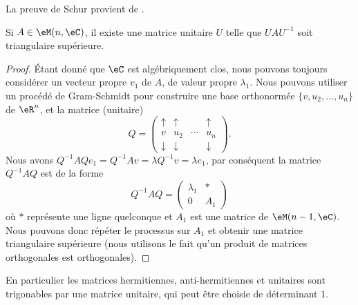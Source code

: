 La preuve de Schur provient de \cite{NormHKNPKRqV}.

\begin{lemma}  \label{LemSchurComplHAftTq}
    Si \( A\in\eM(n,\eC)\), il existe une matrice unitaire \( U\) telle que \( UAU^{-1}\) soit triangulaire supérieure.
\end{lemma}

\begin{proof}
    Étant donné que \( \eC\) est algébriquement clos, nous pouvons toujours considérer un vecteur propre \( v_1\) de \( A\), de valeur propre \( \lambda_1\). Nous pouvons utiliser un procédé de Gram-Schmidt pour construire une base orthonormée \( \{ v,u_2,\ldots, u_n \}\) de \( \eR^n\), et la matrice (unitaire)
    \begin{equation}
        Q=\begin{pmatrix}
             \uparrow   &   \uparrow    &       &   \uparrow    \\
             v   &   u_2    &   \cdots    &   u_n    \\ 
             \downarrow   &   \downarrow    &       &   \downarrow
         \end{pmatrix}.
    \end{equation}
    Nous avons \( Q^{-1}AQe_1=Q^{-1} Av=\lambda Q^{-1} v=\lambda e_1\), par conséquent la matrice \( Q^{-1} AQ\) est de la forme
    \begin{equation}
        Q^{-1}AQ=\begin{pmatrix}
            \lambda_1    &   *    \\ 
            0    &   A_1    
        \end{pmatrix}
    \end{equation}
    où \( *\) représente une ligne quelconque et \( A_1\) est une matrice de \( \eM(n-1,\eC)\). Nous pouvons donc répéter le processus sur \( A_1\) et obtenir une matrice triangulaire supérieure (nous utilisons le fait qu'un produit de matrices orthogonales est orthogonales).  
\end{proof}
En particulier les matrices hermitiennes, anti-hermitiennes et unitaires sont trigonables par une matrice unitaire, qui peut être choisie de déterminant \( 1\).


